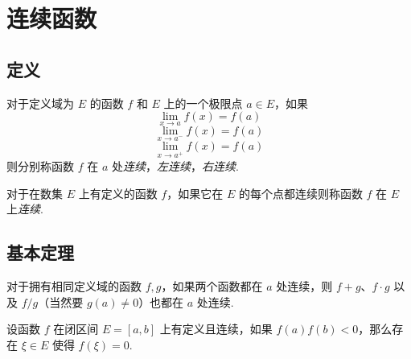 \section{连续函数}
\subsection{定义}
\begin{definition}
    对于定义域为 $E$ 的函数 $f$ 和 $E$ 上的一个极限点 $a \in E$，如果
    \[\lim_{x \rightarrow a} f(x) = f(a)\]
    \[\lim_{x \rightarrow a^-} f(x) = f(a)\]
    \[\lim_{x \rightarrow a^+} f(x) = f(a)\]
    则分别称函数 $f$ 在 $a$ 处\emph{连续}，\emph{左连续}，\emph{右连续}.
\end{definition}\vspace{9pt}

\begin{definition}
    对于在数集 $E$ 上有定义的函数 $f$，如果它在 $E$ 的每个点都连续则称函数 $f$ 在 $E$ 上\emph{连续}.
\end{definition}

\subsection{基本定理}
\begin{theorem}
    对于拥有相同定义域的函数 $f,g$，如果两个函数都在 $a$ 处连续，则 $f+g$、$f \cdot g$ 以及 $f/g$（当然要 $g(a) \neq 0$）也都在 $a$ 处连续.
\end{theorem}\vspace{9pt}

\begin{theorem}
    设函数 $f$ 在闭区间 $E = [a,b]$ 上有定义且连续，如果 $f(a)f(b) < 0$，那么存在 $\xi \in E$ 使得 $f(\xi) = 0$.
\end{theorem}